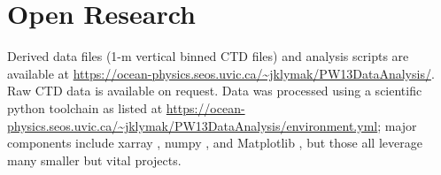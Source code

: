 \documentclass[draft]{agujournal2019}
\begin{document}
%
%

%

%




%
%
%
%
%
%


\section*{Open Research}

Derived data files (1-m vertical binned CTD files) and analysis scripts are available at \url{https://ocean-physics.seos.uvic.ca/~jklymak/PW13DataAnalysis/}.  Raw CTD data is available on request.  Data was processed using a scientific python toolchain as listed at \url{https://ocean-physics.seos.uvic.ca/~jklymak/PW13DataAnalysis/environment.yml}; major
components include xarray \cite{xarray}, numpy \cite{numpy}, and Matplotlib \cite{Matplotlib36}, but those all leverage many smaller but vital projects.
\end{document}
